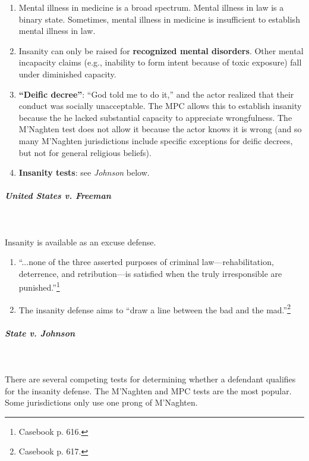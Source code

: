 \begin{enumerate}
    \item Mental illness in medicine is a broad spectrum. Mental illness in 
    law is a binary state. Sometimes, mental illness in medicine is 
    insufficient to establish mental illness in law.
    \item Insanity can only be raised for \textbf{recognized mental 
    disorders}. Other mental incapacity claims (e.g., inability to form intent 
    because of toxic exposure) fall under diminished capacity.
    \item \textbf{``Deific decree''}: ``God told me to do it,'' and the actor 
    realized that their conduct was socially unacceptable. The MPC allows 
    this to establish insanity because the he lacked substantial capacity to 
    appreciate wrongfulness. The M'Naghten test does not allow it because the 
    actor knows it is wrong (and so many M'Naghten jurisdictions include 
    specific exceptions for deific decrees, but not for general religious 
    beliefs).
    \item \textbf{Insanity tests}: see \emph{Johnson} below.
\end{enumerate}

\paragraph{\emph{United States v. Freeman}}
~\\\\
Insanity is available as an excuse defense.

\begin{enumerate}
    \item ``...none of the three asserted purposes of criminal 
    law---rehabilitation, deterrence, and retribution---is satisfied when the 
    truly irresponsible are punished.''\footnote{Casebook p. 616.}
    \item The insanity defense aims to ``draw a line between the bad and the 
    mad.''\footnote{Casebook p. 617.}
\end{enumerate}

\paragraph{\emph{State v. Johnson}}
~\\\\
There are several competing tests for determining whether a defendant 
qualifies for the insanity defense. The M'Naghten and MPC tests are the most 
popular. Some jurisdictions only use one prong of M'Naghten.

